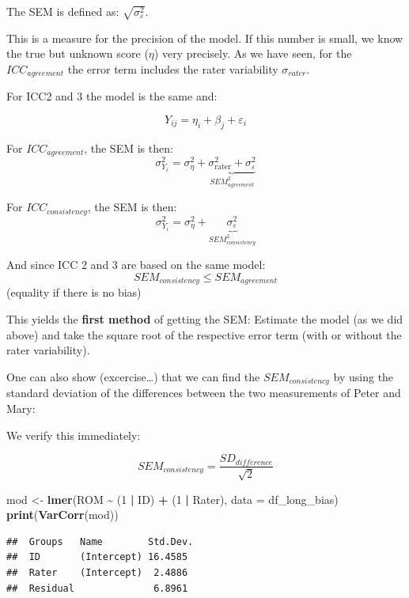 \documentclass[
]{book}
\newenvironment{Shaded}{\begin{snugshade}}{\end{snugshade}}
\newcommand{\AttributeTok}[1]{\textcolor[rgb]{0.13,0.29,0.53}{#1}}
\newcommand{\DecValTok}[1]{\textcolor[rgb]{0.00,0.00,0.81}{#1}}
\newcommand{\FunctionTok}[1]{\textcolor[rgb]{0.13,0.29,0.53}{\textbf{#1}}}
\newcommand{\NormalTok}[1]{#1}
\newcommand{\OtherTok}[1]{\textcolor[rgb]{0.56,0.35,0.01}{#1}}
\newcommand{\SpecialCharTok}[1]{\textcolor[rgb]{0.81,0.36,0.00}{\textbf{#1}}}
\begin{document}
The SEM is defined as: \(\sqrt{\sigma_{\varepsilon}^2}\).

This is a measure for the precision of the model. If this number is small,
we know the true but unknown score (\(\eta\)) very precisely. As we have seen, for the
\(ICC_{agreement}\) the error term includes the rater variability \(\sigma_{rater}\).

For ICC2 and 3 the model is the same and:

\[Y_{ij} = \eta_i + \beta_j + \varepsilon_i\]

For \(ICC_{agreement}\), the SEM is then:
\[\sigma_{Y_i}^2 = \sigma_{\eta}^2 + \underbrace{\sigma_{\text{rater}}^2 + \sigma_{\varepsilon}^2}_{SEM_{agreement}^2}\]

For \(ICC_{consistency}\), the SEM is then:
\[\sigma_{Y_i}^2 = \sigma_{\eta}^2 + \underbrace{\sigma_{\varepsilon}^2}_{SEM_{consistency}^2}\]

And since ICC 2 and 3 are based on the same model:
\[SEM_{consistency} \le SEM_{agreement}\]
(equality if there is no bias)

This yields the \textbf{first method} of getting the SEM: Estimate the
model (as we did above) and take the square root of the respective error term
(with or without the rater variability).

One can also show (excercise\ldots) that we can find the \(SEM_{consistency}\) by using
the standard deviation of the differences between the two measurements
of Peter and Mary:

We verify this immediately:

\[SEM_{consistency} = \frac{SD_{difference}}{\sqrt{2}}\]

\begin{Shaded}
\begin{Highlighting}[]
\NormalTok{mod }\OtherTok{\textless{}{-}} \FunctionTok{lmer}\NormalTok{(ROM }\SpecialCharTok{\textasciitilde{}}\NormalTok{ (}\DecValTok{1} \SpecialCharTok{|}\NormalTok{ ID) }\SpecialCharTok{+}\NormalTok{ (}\DecValTok{1} \SpecialCharTok{|}\NormalTok{ Rater), }\AttributeTok{data =}\NormalTok{ df\_long\_bias)}
\FunctionTok{print}\NormalTok{(}\FunctionTok{VarCorr}\NormalTok{(mod))}
\end{Highlighting}
\end{Shaded}

\begin{verbatim}
##  Groups   Name        Std.Dev.
##  ID       (Intercept) 16.4585 
##  Rater    (Intercept)  2.4886 
##  Residual              6.8961
\end{verbatim}
\end{document}

